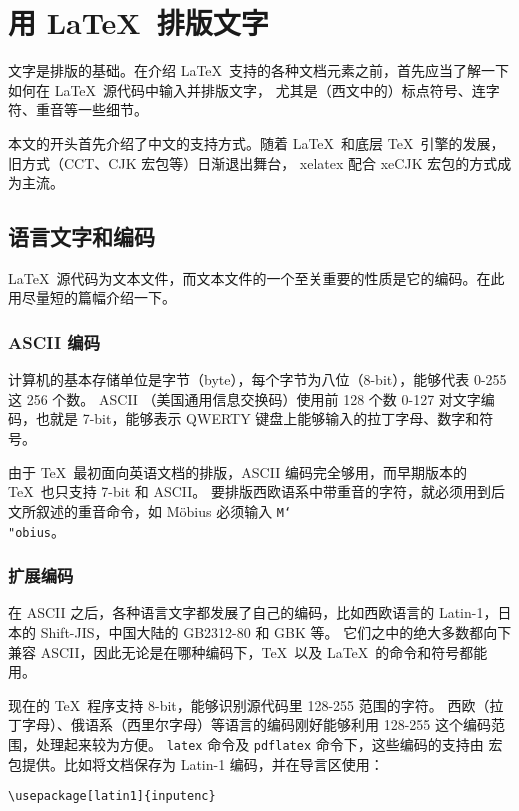 \chapter{用 \LaTeX\ 排版文字}\label{chap:text}

\begin{intro}
文字是排版的基础。在介绍 \LaTeX\ 支持的各种文档元素之前，首先应当了解一下如何在 \LaTeX\ 源代码中输入并排版文字，
尤其是（西文中的）标点符号、连字符、重音等一些细节。

本文的开头首先介绍了中文的支持方式。随着 \LaTeX\ 和底层 \TeX\ 引擎的发展，旧方式（CCT、CJK 宏包等）日渐退出舞台，
xelatex 配合 xeCJK 宏包的方式成为主流。
\end{intro}

\section{语言文字和编码}\label{sec:encoding}

\LaTeX\ 源代码为文本文件，而文本文件的一个至关重要的性质是它的编码。在此用尽量短的篇幅介绍一下。

\subsection{ASCII 编码}\label{subsec:ascii}

计算机的基本存储单位是字节（byte），每个字节为八位（8-bit），能够代表 0-255 这 256 个数。
ASCII （美国通用信息交换码）使用前 128 个数 0-127 对文字编码，也就是 7-bit，能够表示 QWERTY 键盘上能够输入的拉丁字母、数字和符号。

由于 \TeX\ 最初面向英语文档的排版，ASCII 编码完全够用，而早期版本的 \TeX\ 也只支持 7-bit 和 ASCII。
要排版西欧语系中带重音的字符，就必须用到后文所叙述的重音命令，如 M\"obius 必须输入 \texttt{M\char`\\"obius}。

\subsection{扩展编码}\label{subsec:ext-encoding}

在 ASCII 之后，各种语言文字都发展了自己的编码，比如西欧语言的 Latin-1，日本的 Shift-JIS，中国大陆的 GB2312-80 和 GBK 等。
它们之中的绝大多数都向下兼容 ASCII，因此无论是在哪种编码下，\TeX\ 以及 \LaTeX\ 的命令和符号都能用。

现在的 \TeX\ 程序支持 8-bit，能够识别源代码里 128-255 范围的字符。
西欧（拉丁字母）、俄语系（西里尔字母）等语言的编码刚好能够利用 128-255 这个编码范围，处理起来较为方便。
\texttt{latex} 命令及 \texttt{pdflatex} 命令下，这些编码的支持由  宏包提供。比如将文档保存为 Latin-1 编码，并在导言区使用：
\begin{verbatim}
\usepackage[latin1]{inputenc}
\end{verbatim}

